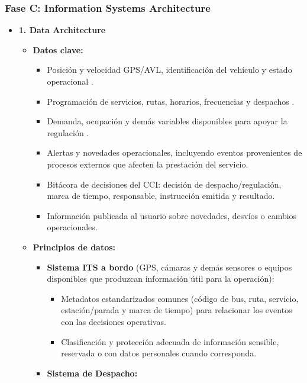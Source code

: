 \begin{singlespace}
\subsubsection*{Fase C: Information Systems Architecture}

\begin{itemize}
	\item \textbf{1. Data Architecture}
	\begin{itemize}
		\item \textbf{Datos clave:}
		\begin{itemize}
			\item[$\Rightarrow$] Posición y velocidad GPS/AVL, identificación del vehículo y estado operacional \parencite{transmilenio2026cci}.
			\item[$\Rightarrow$] Programación de servicios, rutas, horarios, frecuencias y despachos \parencite{transmilenio2020peti}.
			\item[$\Rightarrow$] Demanda, ocupación y demás variables disponibles para apoyar la regulación \parencite{transmilenio2026cci}.
			\item[$\Rightarrow$] Alertas y novedades operacionales, incluyendo eventos provenientes de procesos externos que afecten la prestación del servicio.
			\item[$\Rightarrow$] Bitácora de decisiones del CCI: decisión de despacho/regulación, marca de tiempo, responsable, instrucción emitida y resultado.
			\item[$\Rightarrow$] Información publicada al usuario sobre novedades, desvíos o cambios operacionales.
		\end{itemize}
		\item \textbf{Principios de datos:}
		\begin{itemize}
			\item[$\Rightarrow$] \textbf{Sistema ITS a bordo} (GPS, cámaras y demás sensores o equipos disponibles que produzcan información útil para la operación):
			\begin{itemize}
				\item Metadatos estandarizados comunes (código de bus, ruta, servicio, estación/parada y marca de tiempo) para relacionar los eventos con las decisiones operativas.
				\item Clasificación y protección adecuada de información sensible, reservada o con datos personales cuando corresponda.
			\end{itemize}
			\item[$\Rightarrow$] \textbf{Sistema de Despacho:}
			\begin{itemize}

\end{itemize}
\end{itemize}
\end{itemize}
\end{itemize}
\end{singlespace}
